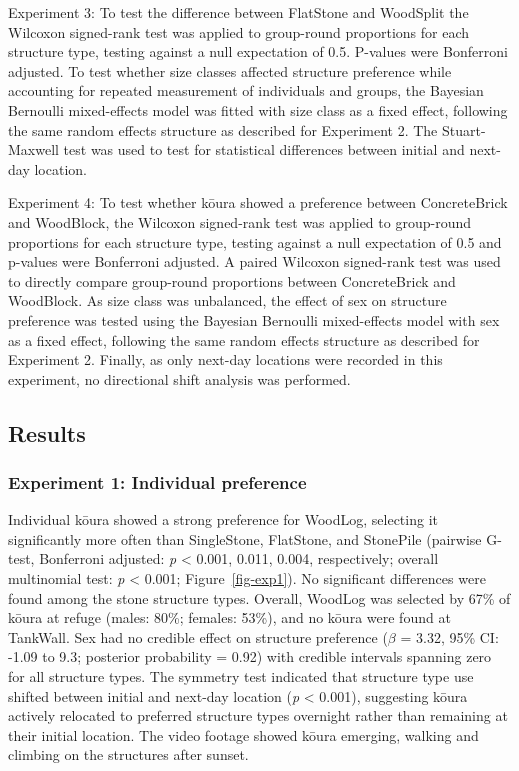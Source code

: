 \documentclass[
  letterpaper,
  DIV=11,
  numbers=noendperiod]{scrartcl}
\begin{document}
Experiment 3: To test the difference between FlatStone and WoodSplit the
Wilcoxon signed-rank test was applied to group-round proportions for
each structure type, testing against a null expectation of 0.5. P-values
were Bonferroni adjusted. To test whether size classes affected
structure preference while accounting for repeated measurement of
individuals and groups, the Bayesian Bernoulli mixed-effects model was
fitted with size class as a fixed effect, following the same random
effects structure as described for Experiment 2. The Stuart-Maxwell test
was used to test for statistical differences between initial and
next-day location.

Experiment 4: To test whether kōura showed a preference between
ConcreteBrick and WoodBlock, the Wilcoxon signed-rank test was applied
to group-round proportions for each structure type, testing against a
null expectation of 0.5 and p-values were Bonferroni adjusted. A paired
Wilcoxon signed-rank test was used to directly compare group-round
proportions between ConcreteBrick and WoodBlock. As size class was
unbalanced, the effect of sex on structure preference was tested using
the Bayesian Bernoulli mixed-effects model with sex as a fixed effect,
following the same random effects structure as described for Experiment
2. Finally, as only next-day locations were recorded in this experiment,
no directional shift analysis was performed.

\subsection{Results}\label{results}

\subsubsection{Experiment 1: Individual
preference}\label{experiment-1-individual-preference-1}

Individual kōura showed a strong preference for WoodLog, selecting it
significantly more often than SingleStone, FlatStone, and StonePile
(pairwise G-test, Bonferroni adjusted: \emph{p} \textless{} 0.001,
0.011, 0.004, respectively; overall multinomial test: \emph{p}
\textless{} 0.001; Figure~\ref{fig-exp1}). No significant differences
were found among the stone structure types. Overall, WoodLog was
selected by 67\% of kōura at refuge (males: 80\%; females: 53\%), and no
kōura were found at TankWall. Sex had no credible effect on structure
preference (\(\beta\) = 3.32, 95\% CI: -1.09 to 9.3; posterior
probability = 0.92) with credible intervals spanning zero for all
structure types. The symmetry test indicated that structure type use
shifted between initial and next-day location (\emph{p} \textless{}
0.001), suggesting kōura actively relocated to preferred structure types
overnight rather than remaining at their initial location. The video
footage showed kōura emerging, walking and climbing on the structures
after sunset.
\end{document}
